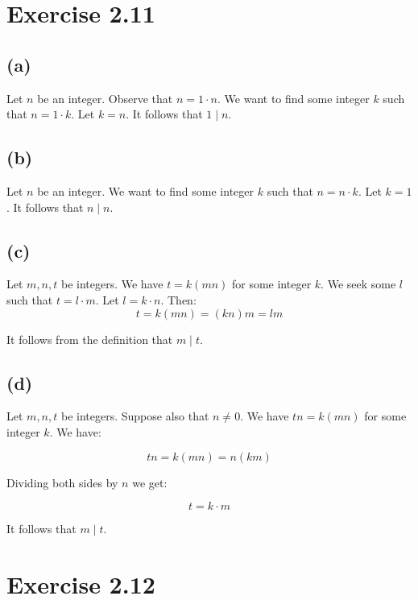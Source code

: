 \documentclass{article}
\begin{document}
\section*{Exercise 2.11}

\subsection*{(a)}

Let $n$ be an integer. Observe that $n = 1 \cdot n$. We want to find some
integer $k$ such that $n = 1 \cdot k$. Let $k=n$. It follows that $1 \mid n$.

\subsection*{(b)}

Let $n$ be an integer. We want to find some integer $k$ such that $n = n \cdot
k$. Let $k=1$. It follows that $n \mid n$.

\subsection*{(c)}

Let $m, n, t$ be integers. We have $t = k(mn)$ for some integer $k$. We seek
some $l$ such that $t = l \cdot m$. Let $l=k \cdot n$. Then:
\begin{equation*}
	t = k(mn) = (kn)m = lm
\end{equation*}

It follows from the definition that $m \mid t$.


\subsection*{(d)}


Let $m, n, t$ be integers. Suppose also that $n \neq 0$. We have $tn = k(mn)$ for some integer $k$. We have:

\begin{equation*}
	tn = k(mn) = n(km) 
\end{equation*}

Dividing both sides by $n$ we get:


\begin{equation*}
	t = k \cdot m
\end{equation*}

It follows that $m \mid t$.



\section*{Exercise 2.12}
\end{document}
